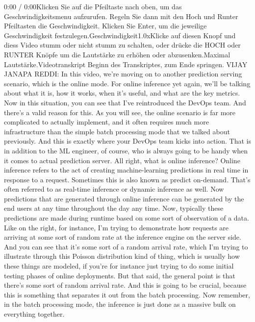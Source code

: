 {{{{{{{    0:00 / 0:00Klicken Sie auf die Pfeiltaste nach oben, um das Geschwindigkeitsmenu aufzurufen. Regeln Sie dann mit den Hoch und Runter Pfeiltasten die Geschwindigkeit. Klicken Sie Enter, um die jeweilige Geschwindigkeit festzulegen.Geschwindigkeit1.0xKlicke auf diesen Knopf und diess Video stumm oder nicht stumm zu schalten, oder drücke die HOCH oder RUNTER Knöpfe um die Lautstärke zu erhöhen oder abzusenken.Maximal Lautstärke.Videotranskript
    Beginn des Transkriptes, zum Ende springen.
    VIJAY JANAPA REDDI: In this video, we're moving on to another prediction
    serving scenario, which is the online mode.
    For online inference yet again, we'll be talking about what it is, how it works,
    when it's useful, and what are the key metrics.
    Now in this situation, you can see that I've reintroduced the DevOps team.
    And there's a valid reason for this.
    As you will see, the online scenario is far more
    complicated to actually implement, and it often
    requires much more infrastructure than the simple batch processing mode
    that we talked about previously.
    And this is exactly where your DevOps team kicks into action.
    That is in addition to the ML engineer, of course,
    who is always going to be handy when it comes to actual prediction server.
    All right, what is online inference?
    Online inference refers to the act of creating machine-learning predictions
    in real time in response to a request.
    Sometimes this is also known as predict on-demand.
    That's often referred to as real-time inference or dynamic inference as well.
    Now predictions that are generated through online inference
    can be generated by the end users at any time throughout the day any time.
    Now, typically these predictions are made during runtime based
    on some sort of observation of a data.
    Like on the right, for instance, I'm trying
    to demonstrate how requests are arriving at some sort of random rate
    at the inference engine on the server side.
    And you can see that it's some sort of a random arrival rate, which
    I'm trying to illustrate through this Poisson distribution kind of thing,
    which is usually how these things are modeled, if you're
    for instance just trying to do some initial testing
    phases of online deployments.
    But that said, the general point is that there's
    some sort of random arrival rate.
    And this is going to be crucial, because this is something that separates it out
    from the batch processing.
    Now remember, in the batch processing mode,
    the inference is just done as a massive bulk on everything together.
}}}}}}}
